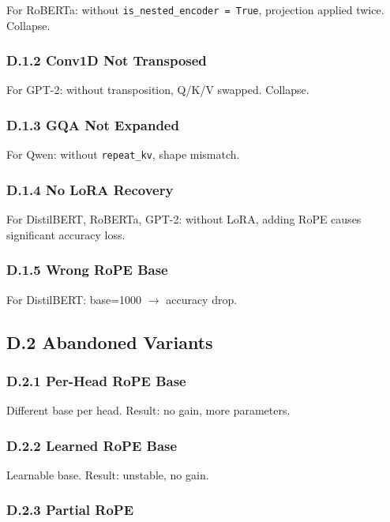 For RoBERTa: without \texttt{is\_nested\_encoder = True}, projection applied twice. 
Collapse.

\subsubsection{D.1.2 Conv1D Not Transposed}

For GPT-2: without transposition, Q/K/V swapped. Collapse.

\subsubsection{D.1.3 GQA Not Expanded}

For Qwen: without \texttt{repeat\_kv}, shape mismatch.

\subsubsection{D.1.4 No LoRA Recovery}

For DistilBERT, RoBERTa, GPT-2: without LoRA, adding RoPE causes 
significant accuracy loss.

\subsubsection{D.1.5 Wrong RoPE Base}

For DistilBERT: base=1000 $\to$ accuracy drop.

\subsection{D.2 Abandoned Variants}

\subsubsection{D.2.1 Per-Head RoPE Base}

Different base per head. Result: no gain, more parameters.

\subsubsection{D.2.2 Learned RoPE Base}

Learnable base. Result: unstable, no gain.

\subsubsection{D.2.3 Partial RoPE}

